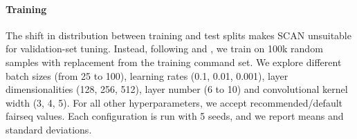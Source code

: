 \paragraph{Training} The shift in distribution between training and
test splits makes SCAN unsuitable for validation-set tuning. Instead,
following  and , we
train on 100k random samples with replacement from the
training command set. We explore different batch sizes (from
25 to 100), learning rates (0.1, 0.01, 0.001), layer dimensionalities
(128, 256, 512), layer number (6 to 10) and convolutional
kernel width (3, 4, 5). For all other hyperparameters, we accept recommended/default fairseq values. Each configuration is run with 5
 seeds, and we report means and standard deviations.




